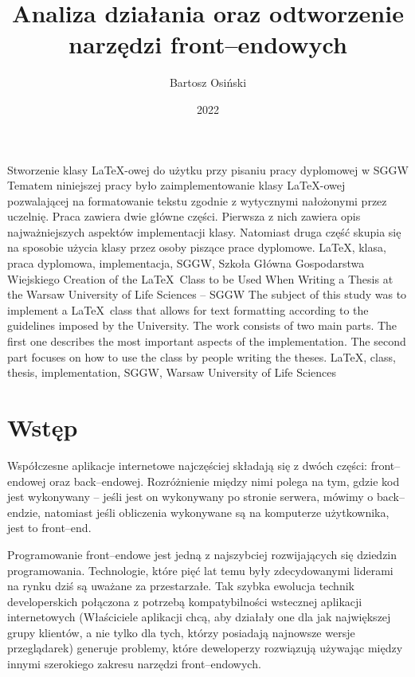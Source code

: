 \documentclass{SGGW-thesis}
\title{Analiza działania oraz odtworzenie narzędzi front--endowych}
\author{Bartosz Osiński}
\date{2022}
\begin{document}
\maketitle
\statementpage
\abstractpage %
{Stworzenie klasy \LaTeX-owej do użytku przy pisaniu pracy dyplomowej w SGGW}
{Tematem niniejszej pracy było zaimplementowanie klasy \LaTeX-owej pozwalającej na formatowanie tekstu zgodnie z wytycznymi nałożonymi przez uczelnię. Praca zawiera dwie
główne części. Pierwsza z nich zawiera opis najważniejszych aspektów implementacji klasy. Natomiast druga część skupia się na sposobie użycia klasy przez osoby piszące prace
dyplomowe.}
{LaTeX, klasa, praca dyplomowa, implementacja, SGGW, Szkoła Główna Gospodarstwa Wiejskiego}
{Creation of the \LaTeX\ Class to be Used When Writing a Thesis at the Warsaw University of Life Sciences -- SGGW}
{The subject of this study was to implement a \LaTeX\ class that allows for text formatting according to the guidelines imposed by the University. The work consists of two
main parts. The first one describes the most important aspects of the implementation. The second part focuses on how to use the class by people writing the theses.}
{LaTeX, class, thesis, implementation, SGGW, Warsaw University of Life Sciences}


{
  \doublespacing
  \tableofcontents
}

\startchapterfromoddpage %


\chapter{Wstęp}
Współczesne aplikacje internetowe najczęściej składają się z dwóch części: front--endowej oraz back--endowej. Rozróżnienie między nimi polega na tym, gdzie kod jest wykonywany -- jeśli jest on wykonywany po stronie serwera, mówimy o back--endzie, natomiast jeśli obliczenia wykonywane są na komputerze użytkownika, jest to front--end.

Programowanie front--endowe jest jedną z najszybciej rozwijających się dziedzin programowania. Technologie, które pięć lat temu były zdecydowanymi liderami na rynku dziś są uważane za przestarzałe. Tak szybka ewolucja technik developerskich połączona z potrzebą kompatybilności wstecznej aplikacji internetowych (Właściciele aplikacji chcą, aby działały one dla jak największej grupy klientów, a nie tylko dla tych, którzy posiadają najnowsze wersje przeglądarek) generuje problemy, które deweloperzy rozwiązują używając między innymi szerokiego zakresu narzędzi front--endowych.
\end{document}
